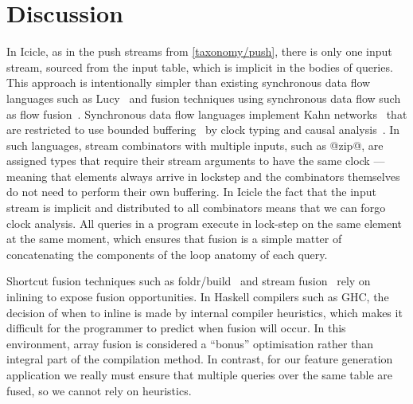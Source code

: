 \section{Discussion}
\label{icicle:s:Conclusion}


In Icicle, as in the push streams from \cref{taxonomy/push}, there is only one input stream, sourced from the input table, which is implicit in the bodies of queries.
This approach is intentionally simpler than existing synchronous data flow languages such as Lucy~\cite{mandel2010lucy} and fusion techniques using synchronous data flow such as flow fusion~\cite{lippmeier2013data}.
Synchronous data flow languages implement Kahn networks~\cite{vrba2009kahn} that are restricted to use bounded buffering~\cite{johnston2004advances} by clock typing and causal analysis~\cite{stephens1997survey}.
In such languages, stream combinators with multiple inputs, such as @zip@, are assigned types that require their stream arguments to have the same clock --- meaning that elements always arrive in lockstep and the combinators themselves do not need to perform their own buffering.
In Icicle the fact that the input stream is implicit and distributed to all combinators means that we can forgo clock analysis.
All queries in a program execute in lock-step on the same element at the same moment, which ensures that fusion is a simple matter of concatenating the components of the loop anatomy of each query.

Shortcut fusion techniques such as foldr/build~\cite{gill1993short} and stream fusion~\cite{coutts2007stream} rely on inlining to expose fusion opportunities.
In Haskell compilers such as GHC, the decision of when to inline is made by internal compiler heuristics, which makes it difficult for the programmer to predict when fusion will occur.
In this environment, array fusion is considered a ``bonus'' optimisation rather than integral part of the compilation method.
In contrast, for our feature generation application we really must ensure that multiple queries over the same table are fused, so we cannot rely on heuristics.

